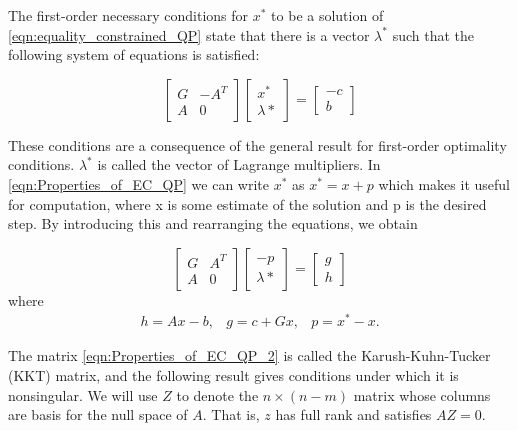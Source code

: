 The first-order necessary conditions for $x^*$ to be a solution of \ref{eqn:equality_constrained_QP} state that there is a vector $\lambda^*$ such that the following system of equations is satisfied:

\begin{equation}
\begin{bmatrix}
  	G & -A^T \\
    A & 0
  \end{bmatrix}
  \begin{bmatrix}
  	x^* \\
    \lambda{*}
  \end{bmatrix}
  =
  \begin{bmatrix}
  	-c \\
    b
  \end{bmatrix}	
  \label{eqn:Properties_of_EC_QP}
\end{equation}

These conditions are a consequence of the general result for first-order optimality conditions.  $\lambda^*$ is called the vector of Lagrange multipliers. In \ref{eqn:Properties_of_EC_QP} we can write $x^*$ as $x^* = x+p$ which makes it useful for computation, where x is some estimate of the solution and p is the desired step. By introducing this and rearranging the equations, we obtain

\begin{equation}
\begin{bmatrix}
  	G & A^T \\
    A & 0
  \end{bmatrix}
  \begin{bmatrix}
  	-p \\
    \lambda{*}
  \end{bmatrix}
  =
  \begin{bmatrix}
  	g \\
    h
  \end{bmatrix}	
  \label{eqn:Properties_of_EC_QP_2}
\end{equation}
where
\begin{equation}
\begin{aligned}
h= Ax-b, & g = c+Gx, & p = x^* - x.
\end{aligned}
\label{eqn:Properties_of_EC_QP_3}	
\end{equation}

The matrix \ref{eqn:Properties_of_EC_QP_2} is called the Karush-Kuhn-Tucker (KKT) matrix, and the following result gives conditions under which it is nonsingular. We will use $Z$ to denote the $n \times (n-m)$ matrix whose columns are basis for the null space of $A$. That is, $z$ has full  rank and satisfies $AZ=0$.

